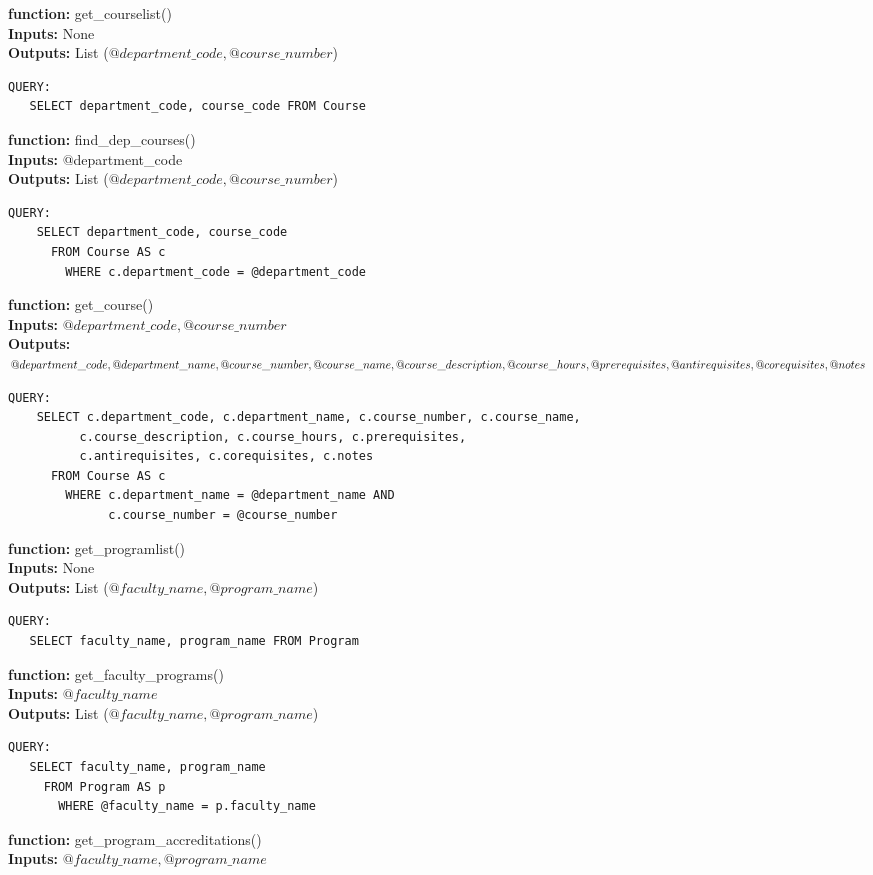 \documentclass[12pt]{article} %
\begin{document}
\textbf{function:} get\_courselist()\\
\textbf{Inputs:} None\\
\textbf{Outputs:} List ($@department\_code, @course\_number$)
\begin{verbatim}
QUERY:
   SELECT department_code, course_code FROM Course
\end{verbatim} 
\textbf{function:} find\_dep\_courses()\\
\textbf{Inputs:} @department\_code\\
\textbf{Outputs:} List ($@department\_code, @course\_number$)
\begin{verbatim}
QUERY:
    SELECT department_code, course_code 
      FROM Course AS c
        WHERE c.department_code = @department_code
\end{verbatim} 
\textbf{function:} get\_course()\\
\textbf{Inputs:} $@department\_code, @course\_number$\\
\textbf{Outputs:} $@department\_code, @department\_name, @course\_number, @course\_name, \\ 
@course\_description, @course\_hours, @prerequisites, @antirequisites, @corequisites, @notes$
\begin{verbatim}
QUERY:
    SELECT c.department_code, c.department_name, c.course_number, c.course_name, 
          c.course_description, c.course_hours, c.prerequisites, 
          c.antirequisites, c.corequisites, c.notes
      FROM Course AS c 
        WHERE c.department_name = @department_name AND 
              c.course_number = @course_number
\end{verbatim} 
\textbf{function:} get\_programlist()\\
\textbf{Inputs:} None\\
\textbf{Outputs:} List ($@faculty\_name, @program\_name$)
\begin{verbatim}
QUERY:
   SELECT faculty_name, program_name FROM Program
\end{verbatim} 
\textbf{function:} get\_faculty\_programs()\\
\textbf{Inputs:} $@faculty\_name$\\
\textbf{Outputs:} List ($@faculty\_name, @program\_name$)
\begin{verbatim}
QUERY:
   SELECT faculty_name, program_name 
     FROM Program AS p
       WHERE @faculty_name = p.faculty_name
\end{verbatim} 
\textbf{function:} get\_program\_accreditations()\\
\textbf{Inputs:} $@faculty\_name, @program\_name$\\
\end{document}
